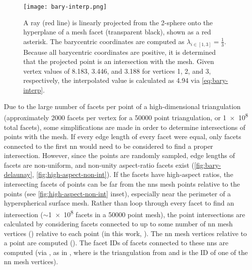 \documentclass[final,12pt]{elsarticle}
\begin{document}
\begin{figure}
	\centering
	\texttt{[image: bary-interp.png]}
	\caption{A ray (red line) is linearly projected from the 2-sphere onto the hyperplane of a mesh facet (transparent black), shown as a red asterisk. The barycentric coordinates are computed as $\lambda_{i \in [1,3]} = \frac{1}{3}$. Because all barycentric coordinates are positive, it is determined that the projected point is an intersection with the mesh. Given vertex values of \num{8.183}, \num{3.446}, and \num{3.188} for vertices 1, 2, and 3, respectively, the interpolated value is calculated as \num{4.94} via \cref{eq:bary-interp}.}
	\label{fig:bary-interp}
\end{figure}
%
%
Due to the large number of facets per point of a high-dimensional triangulation (approximately \num{2000} facets per vertex for a \num{50000} point triangulation, or \num{1e8} total facets), some simplifications are made in order to determine intersections of \outpt{} points with the mesh. If every edge length of every facet were equal, only facets connected to the first \gls{nn} would need to be considered to find a proper intersection. However, since the points are randomly sampled, edge lengths of facets are non-uniform, and non-unity aspect-ratio facets exist (\cref{fig:bary-delaunay}, \cref{fig:high-aspect-non-int}). If the facets have high-aspect ratios, the intersecting facets of \outpt{} points can be far from the \glspl{nn} mesh points relative to the \outpt{} points (see \cref{fig:high-aspect-non-int} inset), especially near the perimeter of a hyperspherical surface mesh. Rather than loop through every facet to find an intersection ($\sim$\num{1e8} facets in a \num{50000} point mesh), the \outpt{} point intersections are calculated by considering facets connected to up to some number of \gls{nn} mesh vertices () relative to each \outpt{} point (in this work, ). The \gls{nn} mesh vertices relative to a \outpt{} point are computed (). The facet IDs of facets connected to these \glspl{nn} are computed (via , as in , where  is the triangulation from  and  is the ID of one of the \gls{nn} mesh vertices).
\end{document}
